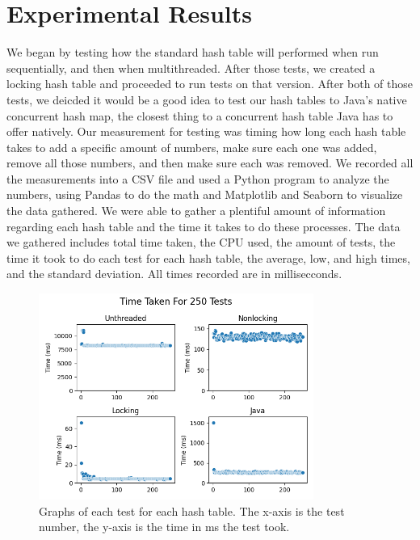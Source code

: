 \documentclass[conference]{IEEEtran}
\begin{document}
\section{Experimental Results}
We began by testing how the standard hash table will performed when run sequentially, and then when multithreaded. 
After those tests, we created a locking hash table and proceeded to run tests on that version. 
After both of those tests, we deicded it would be a good idea to test our hash tables to Java's native concurrent hash map, the closest thing to a concurrent hash table Java has to offer natively.
Our measurement for testing was timing how long each hash table takes to add a specific amount of numbers, make sure each one was added, remove all those numbers, and then make sure each was removed. 
We recorded all the measurements into a CSV file and used a Python program to analyze the numbers, using Pandas to do the math and Matplotlib and Seaborn to visualize the data gathered. 
We were able to gather a plentiful amount of information regarding each hash table and the time it takes to do these processes. 
The data we gathered includes total time taken, the CPU used, the amount of tests, the time it took to do each test for each hash table, the average, low, and high times, and the standard deviation. All times recorded are in millisecconds. 
\begin{figure}[htbp]
    \centerline{\includegraphics[width=90mm,scale=1]{250trials.png}}
    \caption{Graphs of each test for each hash table. The x-axis is the test number, the y-axis is the time in ms the test took. }
    \label{fig}
\end{figure}
\end{document}
